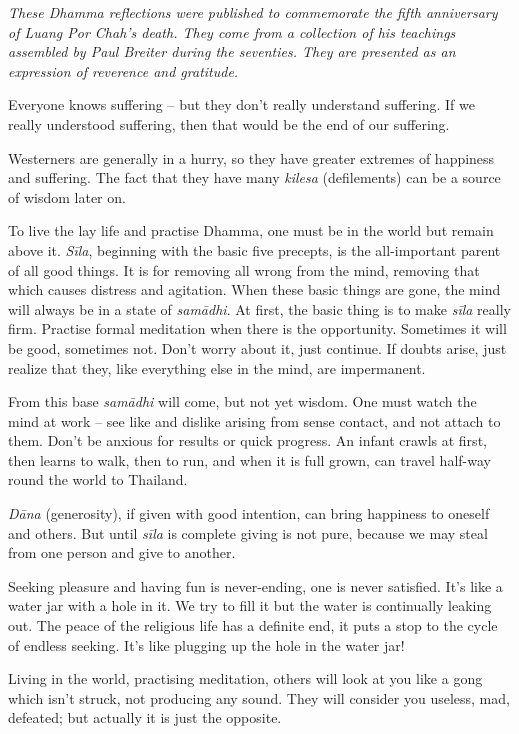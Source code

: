 
\emph{These Dhamma reflections were published to commemorate the fifth
anniversary of Luang Por Chah's death. They come from a collection of
his teachings assembled by Paul Breiter during the
seventies. They are presented as an expression of reverence and
gratitude.}

Everyone knows suffering -- but they don't really understand suffering.
If we really understood suffering, then that would be the end of our
suffering.

Westerners are generally in a hurry, so they have greater extremes of
happiness and suffering. The fact that they have many \emph{kilesa}
 (defilements) can be a source of wisdom later on.

To live the lay life and practise Dhamma, one must be in the world but
remain above it. \emph{Sīla}, beginning with the basic five precepts, is
the all-important parent of all good things. It is for removing all
wrong from the mind, removing that which causes distress and agitation. 
When these basic things are gone, the mind will always be in a state of
\emph{samādhi}. At first, the basic thing is to make \emph{sīla} really
firm. Practise formal meditation when there is the opportunity. 
Sometimes it will be good, sometimes not. Don't worry about it, just
continue. If doubts arise, just realize that they, like everything else
in the mind, are impermanent.

From this base \emph{samādhi} will come, but not yet wisdom. One must watch
the mind at work -- see like and dislike arising from sense contact, and
not attach to them. Don't be anxious for results or quick progress. An
infant crawls at first, then learns to walk, then to run, and when it is
full grown, can travel half-way round the world to Thailand. 

\emph{Dāna} (generosity), if given with good intention, can bring
happiness to oneself and others. But until \emph{sīla} is complete
giving is not pure, because we may steal from one person and give to
another. 

Seeking pleasure and having fun is never-ending, one is never satisfied. 
It's like a water jar with a hole in it. We try to fill it but the water
is continually leaking out. The peace of the religious life has a
definite end, it puts a stop to the cycle of endless seeking. It's like
plugging up the hole in the water jar! 

Living in the world, practising meditation, others will look at you like
a gong which isn't struck, not producing any sound. They will consider
you useless, mad, defeated; but actually it is just the opposite. 

